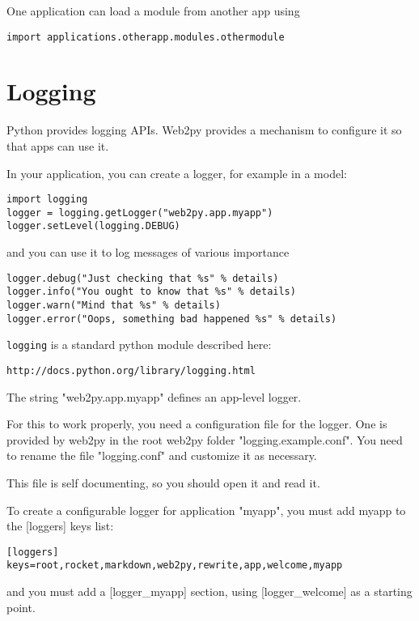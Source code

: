 \documentclass[justified,sixbynine,notoc]{tufte-book}
\def\ft{\small\tt}
\begin{document}
\begin{fullwidth}
One application can load a module from another app using

\begin{lstlisting}
import applications.otherapp.modules.othermodule
\end{lstlisting}

\goodbreak\section{Logging}

Python provides logging APIs. Web2py provides a mechanism to configure it so
that apps can use it.

In your application, you can create a logger, for example in a model:

\begin{lstlisting}
import logging
logger = logging.getLogger("web2py.app.myapp")
logger.setLevel(logging.DEBUG)
\end{lstlisting}
\noindent and you can use it to log messages of various importance

\begin{lstlisting}
logger.debug("Just checking that %s" % details)
logger.info("You ought to know that %s" % details)
logger.warn("Mind that %s" % details)
logger.error("Oops, something bad happened %s" % details)
\end{lstlisting}

{\ft logging} is a standard python module described here:
\begin{lstlisting}[keywords={}]
http://docs.python.org/library/logging.html
\end{lstlisting}
The string "web2py.app.myapp" defines an app-level logger.

For this to work properly, you need a configuration file for the logger.
One is provided by web2py in the root web2py folder "logging.example.conf". You need to rename the file "logging.conf" and customize it as necessary.

This file is self documenting, so you should open it and read it.

To create a configurable logger for application "myapp", you must add myapp to
the [loggers] keys list:

\begin{lstlisting}
[loggers]
keys=root,rocket,markdown,web2py,rewrite,app,welcome,myapp
\end{lstlisting}
\noindent and you must add a [logger\_myapp] section, using [logger\_welcome] as a starting point.


\end{fullwidth}
\end{document}
